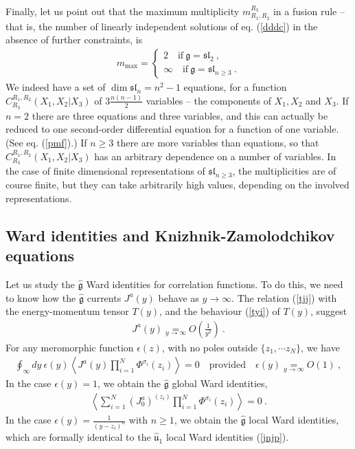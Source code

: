\documentclass[12pt,a4paper,notitlepage]{report}
\newcommand \la {\left\langle}
\newcommand \ra {\right\rangle}
\newcommand \bla {\left\{\begin{array}{l} }
\newcommand \ela {\end{array}\right. }
\numberwithin{equation}{section}
\theoremstyle{break}
\begin{document}
Finally, let us point out that the maximum multiplicity $m_{R_1,R_2}^{R_3}$ in a fusion rule -- that is, the number of linearly independent solutions of eq. (\ref{dddc}) in the absence of further constraints, is 
\begin{align}
 m_{\mathrm{max}} = \bla 2 \quad \text{if}\ \mathfrak{g}=\mathfrak{sl}_2\ , \\ \infty \quad \text{if}\ \mathfrak{g}=\mathfrak{sl}_{n\geq 3}\ . \ela
\end{align}
We indeed have a set of $\dim \mathfrak{sl}_n=n^2-1$ equations, for a function $C^{R_1,R_2}_{R_3}(X_1,X_2|X_3)$ of $3\frac{n(n-1)}{2}$ variables -- the components of $X_1,X_2$ and $X_3$. If $n=2$ there are three equations and three variables, and this can actually be reduced to one second-order differential equation for a function of one variable. (See eq. (\ref{pmf}).)
If $n\geq 3$ there are more variables than equations, so that $C^{R_1,R_2}_{R_3}(X_1,X_2|X_3)$ has an arbitrary dependence on a number of variables. In the case of finite dimensional representations of $\mathfrak{sl}_{n\geq 3}$, the multiplicities are of course finite, but they can take arbitrarily high values, depending on the involved representations.

\subsection{Ward identities and Knizhnik-Zamolodchikov equations \label{secwikz}}

Let us study the $\hat{\mathfrak{g}}$ Ward identities for correlation functions. To do this, we need to know how the $\hat{\mathfrak{g}}$ currents $J^a(y)$ behave as $y\rightarrow \infty$. The relation (\ref{tjj}) with the energy-momentum tensor $T(y)$, and the behaviour (\ref{tyi}) of $T(y)$, suggest
\begin{align}
 \boxed{J^a(y) \underset{y\rightarrow \infty}{=} O\left(\frac{1}{y^2}\right)}\ .
\label{jayi}
\end{align}
For any meromorphic function $\epsilon(z)$, with no poles outside $\{z_1,\cdots z_N\}$, we have 
\begin{align}
 \oint_\infty dy\ \epsilon(y) \la J^a(y)  \prod_{i=1}^N \Phi^{\sigma_i}(z_i)\ra = 0 \quad \text{provided} \quad \epsilon(y) \underset{y\rightarrow\infty}{=} O(1)\ ,
\end{align}
In the case $\epsilon(y)=1$, we obtain the $\hat{\mathfrak{g}}$ global Ward identities,
\begin{align}
 \la \sum_{i=1}^N (J_0^a)^{(z_i)} \prod_{i=1}^N \Phi^{\sigma_i}(z_i)\ra=0\ .
\end{align}
In the case $\epsilon(y)=\frac{1}{(y-z_i)^n}$ with $n\geq 1$, we obtain the $\hat{\mathfrak{g}}$ local Ward identities, which are formally identical to the $\hat{\mathfrak{u}}_1$ local Ward identities (\ref{jnjp}). 
\end{document}
